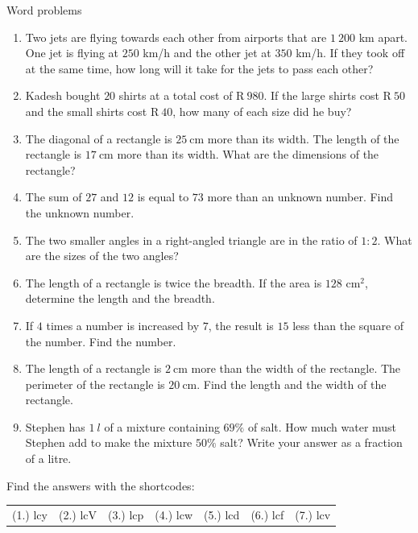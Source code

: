 \begin{exercises}{Word problems}
{
\begin{enumerate}[noitemsep, label=\textbf{\arabic*}. ] 
\item Two jets are flying towards each other from airports that are $1~200$ km apart. One jet is flying at $250$ km/h and the other jet at $350$ km/h. If they took off at the same time, how long will it take for the jets to pass each other?
\item Kadesh bought $20$ shirts at a total cost of R$~980$. If the large shirts cost R$~50$ and the small shirts cost R$~40$, how many of each size did he buy?
\item The diagonal of a rectangle is $25~$cm more than its width. The length of the rectangle is $17~$cm more than its width. What are the dimensions of the rectangle?  
\item The sum of $27$ and $12$ is equal to $73$ more than an unknown number. Find the unknown number.
\item The two smaller angles in a right-angled triangle are in the ratio of $1:2$. What are the sizes of the two angles? 
\item The length of a rectangle is twice the breadth. If the area is $128$ cm$^{2}$, determine the length and the breadth.       
\item If $4$ times a number is increased by $7$, the result is $15$ less than the square of the number. Find the number.
\item The length of a rectangle is $2~$cm more than the width of the rectangle. The perimeter of the rectangle is $20~$cm. Find the length and the width of the rectangle.
\item Stephen has $1~l$ of a mixture containing $69\%$ of salt. How much water must Stephen add to make the mixture $50\%$ salt? Write your answer as a fraction of a litre.
       
\end{enumerate}

\par {} Find the answers with the shortcodes:
\par \begin{tabular}[h]{cccccc}
(1.) lcy  &  (2.) lcV  &  (3.) lcp  &  (4.) lcw  &  (5.) lcd  &  (6.) lcf  &  (7.) lcv  & \end{tabular}
}
\end{exercises}

